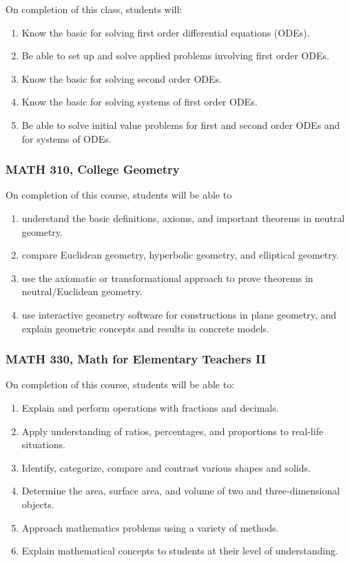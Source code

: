 \documentclass[11pt]{article}
\newenvironment{alphalist}{
\begin{enumerate}[label=(\arabic*),widest=107 ,leftmargin=25pt, itemsep=0pt]}
{\end{enumerate}}
\begin{document}
On completion of this class, students will: 
\begin{alphalist}
    \item Know the basic for solving first order differential equations (ODEs).
    \item Be able to set up and solve applied problems involving first order ODEs.
    \item Know the basic for solving second order ODEs.
    \item Know the basic for solving systems of first order ODEs.
    \item Be able to solve initial value problems for first and second order ODEs and for systems of ODEs.
\end{alphalist}

\subsubsection*{MATH 310, College Geometry}

On completion of this course, students will be able to
\begin{alphalist}
    \item understand the basic definitions, axioms, and important theorems in neutral geometry.
    \item compare Euclidean geometry, hyperbolic geometry, and elliptical geometry.
    \item use the axiomatic or transformational approach to prove theorems in neutral/Euclidean geometry.
    \item use interactive geometry software for constructions in plane geometry, and
    explain geometric concepts and results in concrete models.
\end{alphalist}

\subsubsection*{MATH 330, Math for Elementary Teachers II}

On completion of this course, students will be able to: 
\begin{alphalist}
\item Explain and perform operations with fractions and decimals. 
\item Apply understanding of ratios, percentages, and proportions to real-life situations. 
\item Identify, categorize, compare and contrast various shapes and solids. 
\item Determine the area, surface area, and volume of two and three-dimensional objects. 
\item Approach mathematics problems using a variety of methods. 
\item Explain mathematical concepts to students at their level of understanding.
\end{alphalist}
\end{document}
